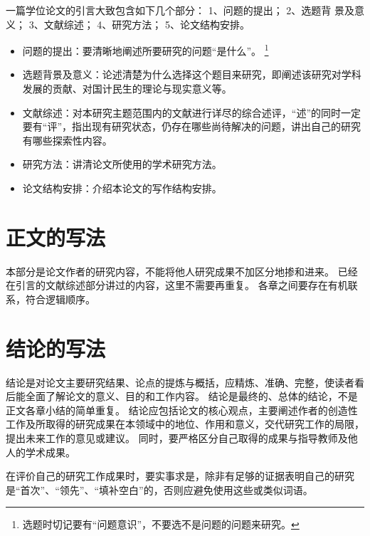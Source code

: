 一篇学位论文的引言大致包含如下几个部分：
1、问题的提出；
2、选题背 景及意义；
3、文献综述；
4、研究方法；
5、论文结构安排。
\begin{itemize}
  \item 问题的提出：要清晰地阐述所要研究的问题“是什么”。
    \footnote{选题时切记要有“问题意识”，不要选不是问题的问题来研究。}
  \item 选题背景及意义：论述清楚为什么选择这个题目来研究，即阐述该研究对学科发展的贡献、对国计民生的理论与现实意义等。
  \item 文献综述：对本研究主题范围内的文献进行详尽的综合述评，“述”的同时一定要有“评”，指出现有研究状态，仍存在哪些尚待解决的问题，讲出自己的研究有哪些探索性内容。
  \item 研究方法：讲清论文所使用的学术研究方法。
  \item 论文结构安排：介绍本论文的写作结构安排。
\end{itemize}



\section{正文的写法}

本部分是论文作者的研究内容，不能将他人研究成果不加区分地掺和进来。
已经在引言的文献综述部分讲过的内容，这里不需要再重复。
各章之间要存在有机联系，符合逻辑顺序。



\section{结论的写法}

结论是对论文主要研究结果、论点的提炼与概括，应精炼、准确、完整，使读者看后能全面了解论文的意义、目的和工作内容。
结论是最终的、总体的结论，不是正文各章小结的简单重复。
结论应包括论文的核心观点，主要阐述作者的创造性工作及所取得的研究成果在本领域中的地位、作用和意义，交代研究工作的局限，提出未来工作的意见或建议。
同时，要严格区分自己取得的成果与指导教师及他人的学术成果。

在评价自己的研究工作成果时，要实事求是，除非有足够的证据表明自己的研究是“首次”、“领先”、“填补空白”的，否则应避免使用这些或类似词语。

\fi
